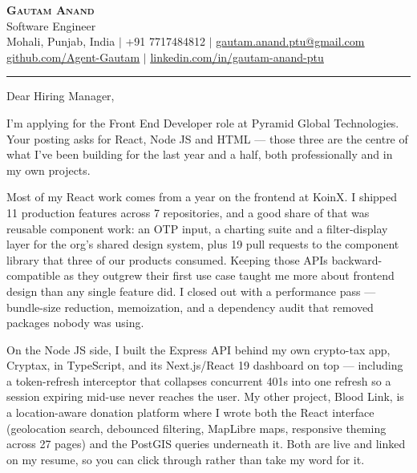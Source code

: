 \documentclass[letterpaper,11pt]{article}
\begin{document}
\begin{center}
    \textbf{\Huge \scshape Gautam Anand} \\ \vspace{2pt}
    \small Software Engineer \\ \vspace{2pt}
    \small Mohali, Punjab, India $|$ +91 7717484812 $|$
    \href{mailto:gautam.anand.ptu@gmail.com}{\underline{gautam.anand.ptu@gmail.com}} \\ \vspace{1pt}
    \small \href{https://github.com/Agent-Gautam}{\underline{github.com/Agent-Gautam}} $|$
    \href{https://www.linkedin.com/in/gautam-anand-ptu}{\underline{linkedin.com/in/gautam-anand-ptu}}
\end{center}

\vspace{6pt}
\hrule
\vspace{10pt}

Dear Hiring Manager,

I'm applying for the Front End Developer role at Pyramid Global Technologies. Your posting asks for React, Node JS and HTML --- those three are the centre of what I've been building for the last year and a half, both professionally and in my own projects.

Most of my React work comes from a year on the frontend at KoinX. I shipped 11 production features across 7 repositories, and a good share of that was reusable component work: an OTP input, a charting suite and a filter-display layer for the org's shared design system, plus 19 pull requests to the component library that three of our products consumed. Keeping those APIs backward-compatible as they outgrew their first use case taught me more about frontend design than any single feature did. I closed out with a performance pass --- bundle-size reduction, memoization, and a dependency audit that removed packages nobody was using.

On the Node JS side, I built the Express API behind my own crypto-tax app, Cryptax, in TypeScript, and its Next.js/React 19 dashboard on top --- including a token-refresh interceptor that collapses concurrent 401s into one refresh so a session expiring mid-use never reaches the user. My other project, Blood Link, is a location-aware donation platform where I wrote both the React interface (geolocation search, debounced filtering, MapLibre maps, responsive theming across 27 pages) and the PostGIS queries underneath it. Both are live and linked on my resume, so you can click through rather than take my word for it.
\end{document}
